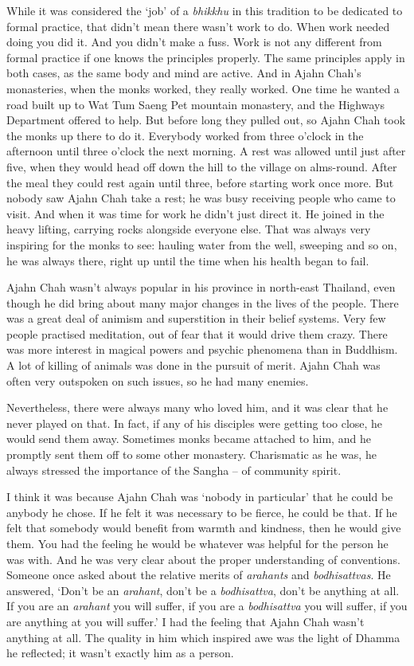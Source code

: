 While it was considered the `job' of a \emph{bhikkhu} in this tradition
to be dedicated to formal practice, that didn't mean there wasn't work
to do. When work needed doing you did it. And you didn't make a fuss. 
Work is not any different from formal practice if one knows the
principles properly. The same principles apply in both cases, as the
same body and mind are active. And in Ajahn Chah's monasteries, when the
monks worked, they really worked. One time he wanted a road built up to
Wat Tum Saeng Pet mountain monastery, and the Highways Department
offered to help. But before long they pulled out, so Ajahn Chah took the
monks up there to do it. Everybody worked from three o'clock in the
afternoon until three o'clock the next morning. A rest was allowed until
just after five, when they would head off down the hill to the village
on alms-round. After the meal they could rest again until three, before
starting work once more. But nobody saw Ajahn Chah take a rest; he was
busy receiving people who came to visit. And when it was time for work
he didn't just direct it. He joined in the heavy lifting, carrying rocks
alongside everyone else. That was always very inspiring for the monks to
see: hauling water from the well, sweeping and so on, he was always
there, right up until the time when his health began to fail. 

Ajahn Chah wasn't always popular in his province in north-east Thailand, 
even though he did bring about many major changes in the lives of the
people. There was a great deal of animism and superstition in their
belief systems. Very few people practised meditation, out of fear that
it would drive them crazy. There was more interest in magical powers and
psychic phenomena than in Buddhism. A lot of killing of animals was done
in the pursuit of merit. Ajahn Chah was often very outspoken on such
issues, so he had many enemies. 

Nevertheless, there were always many who loved him, and it was clear
that he never played on that. In fact, if any of his disciples were
getting too close, he would send them away. Sometimes monks became
attached to him, and he promptly sent them off to some other monastery. 
Charismatic as he was, he always stressed the importance of the Sangha
-- of community spirit. 

I think it was because Ajahn Chah was `nobody in particular' that he
could be anybody he chose. If he felt it was necessary to be fierce, he
could be that. If he felt that somebody would benefit from warmth and
kindness, then he would give them. You had the feeling he would be
whatever was helpful for the person he was with. And he was very clear
about the proper understanding of conventions. Someone once asked about
the relative merits of \emph{arahants} and \emph{bodhisattvas}. He
answered, `Don't be an \emph{arahant}, don't be a \emph{bodhisattva}, 
don't be anything at all. If you are an \emph{arahant} you will suffer, 
if you are a \emph{bodhisattva} you will suffer, if you are anything at
you will suffer.' I had the feeling that Ajahn Chah wasn't anything at
all. The quality in him which inspired awe was the light of Dhamma he
reflected; it wasn't exactly him as a person. 

